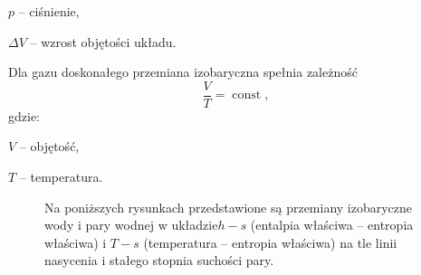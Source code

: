 \documentclass{article}
\begin{document}
${\displaystyle p}$ – ciśnienie,
\vspace{2ex}

${\displaystyle \Delta V}$ – wzrost objętości układu.
\vspace{2ex}

Dla gazu doskonałego przemiana izobaryczna spełnia zależność 
\begin{equation}
{\displaystyle {\frac {V}{T}}=\operatorname {const} ,}
\end{equation}
gdzie:
\vspace{2ex}

${\displaystyle V}$ – objętość,
\vspace{2ex}

${\displaystyle T}$ – temperatura.

\begin{figure}[h]
\centering
\caption[Przemiana izobaryczna]{\label{rys:termo2}
   Na poniższych rysunkach przedstawione są przemiany izobaryczne wody i pary wodnej w układzie$ h-s$ (entalpia właściwa – entropia właściwa) i $T-s$ (temperatura – entropia właściwa) na tle linii nasycenia i stałego stopnia suchości pary.
} \vspace{2ex}
\end{figure}
\end{document}
